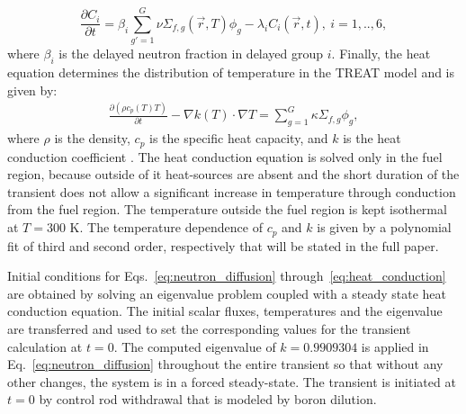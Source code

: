 \documentclass{anstrans}
\begin{document}
\begin{equation}\label{eq:delayed_precursors}
   \frac{\partial C_i }{\partial t} = \beta_i \sum\limits_{g'=1}^G \nu \Sigma_{f,g} (\vec{r},T) \phi_{g} - \lambda_i C_i(\vec{r},t),~i=1,..,6,
\end{equation} 
where $\beta_i$ is the delayed neutron fraction in delayed group $i$. Finally, the heat equation determines the distribution of temperature in the TREAT model and is given by:
\begin{align}\label{eq:heat_conduction}
  \frac{\partial (\rho c_p(T)T)}{\partial t} - \nabla k(T) \cdot \nabla T =\sum\limits_{g=1}^G \kappa \Sigma_{f,g} \phi_g,
\end{align}
where $\rho$ is the density, $c_p$ is the specific heat capacity, and $k$ is the heat conduction coefficient . The heat conduction equation is solved only in the fuel region, because outside of it heat-sources are absent and the short duration of the transient does not allow a significant increase in temperature through conduction from the fuel region. The temperature outside the fuel region is kept isothermal at $T=300$ K. The temperature dependence of $c_p$ and $k$ is given by a polynomial fit of third and second order, respectively that will be stated in the full paper.

Initial conditions for Eqs.~\eqref{eq:neutron_diffusion} through~\eqref{eq:heat_conduction} are obtained by solving an eigenvalue problem coupled with a steady state heat conduction equation. The initial scalar fluxes, temperatures and the eigenvalue are transferred and used to set the corresponding values for the transient calculation at $t=0$. 
The computed eigenvalue of $k=0.9909304$ is applied in Eq.~\eqref{eq:neutron_diffusion} throughout the entire transient so that without any other changes, the system is in a forced steady-state. The transient is initiated at $t=0$ by control rod withdrawal that is modeled by boron dilution. 

\end{document}
